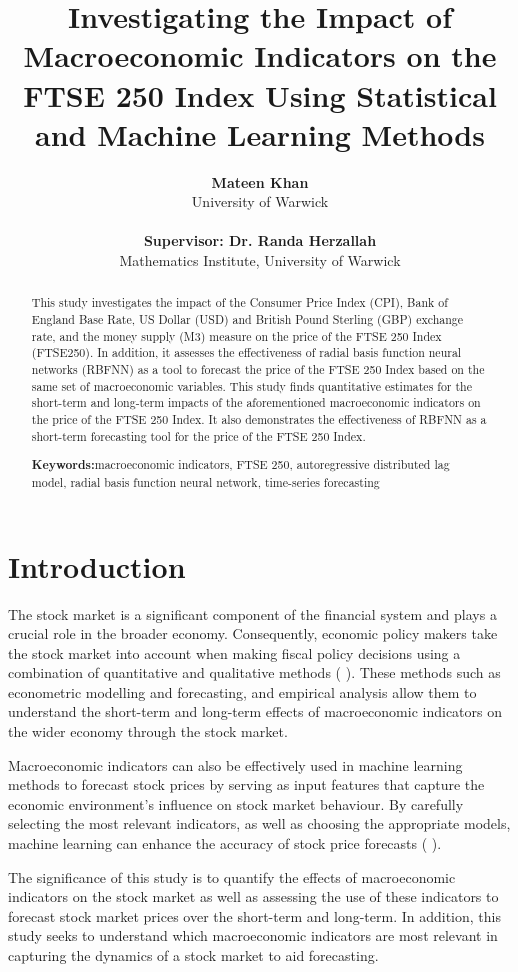 \documentclass[11pt,a4paper]{article}
\title{{Investigating the Impact of Macroeconomic Indicators
on the FTSE 250 Index Using Statistical and Machine Learning Methods}}
\author{
  \textbf{Mateen Khan} \\
  University of Warwick  \\ 
  \\
  \textbf{Supervisor: Dr. Randa Herzallah} \\
  Mathematics Institute, University of Warwick
}
\providecommand{\keywordname}{\textbf{Keywords:}} %
\newcommand{\keywords}[1]{%
  \par\addvspace{\baselineskip}%
  \noindent\keywordname\enspace\ignorespaces#1 %
}
\newcommand{\citeboth}[1]{\citeauthor{#1} \citep{#1}}
\begin{document}
\maketitle

\begin{abstract}
    This study investigates the impact of the Consumer Price Index (CPI), Bank of England Base Rate, US Dollar (USD) and British Pound Sterling (GBP) exchange rate, and the money supply (M3) measure on the price of the FTSE 250 Index (FTSE250).
    In addition, it assesses the effectiveness of radial basis function neural networks (RBFNN) as a tool to forecast the price of the FTSE 250 Index based on the same set of macroeconomic variables. This study finds quantitative estimates for the short-term and long-term impacts of the aforementioned macroeconomic indicators on the price of the FTSE 250 Index. It also demonstrates the effectiveness of RBFNN as a short-term forecasting tool for the price of the FTSE 250 Index.
    \keywords{macroeconomic indicators, FTSE 250, autoregressive distributed lag model, radial basis function neural network, time-series forecasting}
\end{abstract}

\section{Introduction}

The stock market is a significant component of the financial system and 
plays a crucial role in the broader economy. Consequently, economic policy 
makers take the stock market into account when making fiscal policy 
decisions using a combination of quantitative and qualitative methods (\citeboth{DemirgucKunt1996}). 
These methods such as econometric modelling and forecasting, and empirical 
analysis allow them to understand the short-term and long-term effects of 
macroeconomic indicators
on the wider economy through the stock market.

Macroeconomic indicators can also be effectively used in machine learning 
methods to forecast stock prices by serving as input features that capture 
the economic environment’s influence on stock market behaviour. By carefully 
selecting the most relevant indicators, 
as well as choosing the appropriate models, machine learning can enhance the accuracy of stock price forecasts (\citeboth{Prasad2023}).

The significance of this study is to quantify the effects of macroeconomic indicators on the stock market as well as assessing the use of these indicators to forecast stock market prices over the short-term and long-term. In addition, this study seeks to understand which macroeconomic indicators are most relevant in capturing the dynamics of a stock market to aid forecasting.
\end{document}
